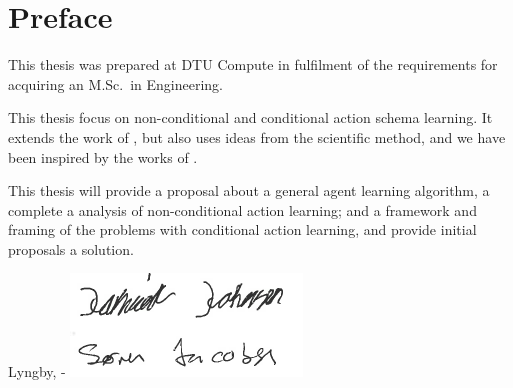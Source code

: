 \chapter{Preface}

This thesis was prepared at DTU Compute in fulfilment of the requirements for acquiring an M.Sc.\ in Engineering.

This thesis focus on non-conditional and conditional action schema learning.
It extends the work of \cite{Walsh2008}, but also uses ideas from the scientific method, and we have been inspired by the works of \cite{popper1959a}.

This thesis will provide a proposal about a general agent learning algorithm, a complete a analysis of non-conditional action learning; and a framework and framing of the problems with conditional action learning, and provide initial proposals a solution.
\vspace{20mm}
\begin{center}
    \hspace{20mm} Lyngby, \thesishandin-\thesisyear
    \vspace{5mm}
    \newline
    \includegraphics[scale=0.8]{Graphics/signatures}
\end{center}
\begin{flushright}
    \thesisauthor
\end{flushright}
